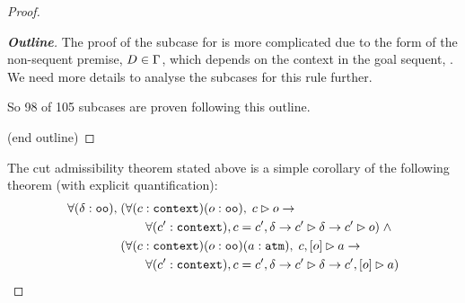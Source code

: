 \begin{proof}
\begin{proof}[\textbf{Outline}]
The proof of the subcase for \rlnmsinit{} is more complicated due to the form of the non-sequent premise, $D \in \dyncon{}$, which depends on the context in the goal sequent, . We need more details to analyse the subcases for this rule further.

So 98 of 105 subcases are proven following this outline.

\hfill (end outline)

\hfill \end{proof}

The cut admissibility theorem stated above is a simple corollary of the following theorem (with explicit quantification):
\begin{align*}
\forall (\delta : \sltm{oo}), \; & (\forall (c : \sltm{context}) (o : \sltm{oo}), \; \seqsl[c]{o} \rightarrow \\
& \qquad \forall (\inddyncon{} : \sltm{context}), c = \inddyncon{}, \delta \rightarrow \seqsl[\inddyncon{}]{\delta} \rightarrow \seqsl[\inddyncon{}]{o}) \; \wedge \\
& (\forall (c : \sltm{context}) (o : \sltm{oo}) (a : \hybridtm{atm}), \; \bchsl[c]{o}{a} \rightarrow \\
& \qquad \forall (\inddyncon : \sltm{context}), c = \inddyncon{}, \delta \rightarrow \seqsl[\inddyncon{}]{\delta} \rightarrow \bchsl[\inddyncon{}]{o}{a})
\end{align*}



\end{proof}
